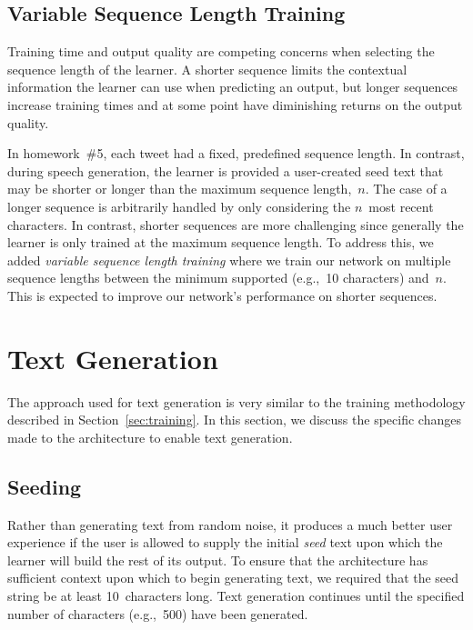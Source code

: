 \documentclass{article}
\begin{document}
\subsection{Variable Sequence Length Training}

Training time and output quality are competing concerns when selecting the sequence length of the learner.  A shorter sequence limits the contextual information the learner can use when predicting an output, but longer sequences increase training times and at some point have diminishing returns on the output quality.

In homework~\#5, each tweet had a fixed, predefined sequence length.  In contrast, during speech generation, the learner is provided a user-created seed text that may be shorter or longer than the maximum sequence length,~$n$.  The case of a longer sequence is arbitrarily handled by only considering the $n$~most recent characters.  In contrast, shorter sequences are more challenging since generally the learner is only trained at the maximum sequence length.  To address this, we added \textit{variable sequence length training} where we train our network on multiple sequence lengths between the minimum supported (e.g.,~10 characters) and~$n$.  This is expected to improve our network's performance on shorter sequences.

\section{Text Generation}

The approach used for text generation is very similar to the training methodology described in Section~\ref{sec:training}.  In this section, we discuss the specific changes made to the architecture to enable text generation.

\subsection{Seeding}

Rather than generating text from random noise, it produces a much better user experience if the user is allowed to supply the initial \textit{seed} text upon which the learner will build the rest of its output.  To ensure that the architecture has sufficient context upon which to begin generating text, we required that the seed string be at least 10~characters long.  Text generation continues until the specified number of characters (e.g.,~500) have been generated.
\end{document}
